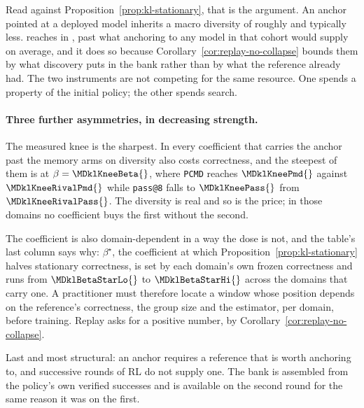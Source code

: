 \documentclass{article}
\newcommand{\1}{\mathbf 1}
\newcommand{\pmd}{\texttt{PCMD}}
\theoremstyle{remark}
\theoremstyle{definition}
\theoremstyle{plain}
\begin{document}
Read against Proposition~\ref{prop:kl-stationary}, that is the argument. An
anchor pointed at a deployed model inherits a macro diversity of roughly
\MDklHostedHi{} and typically less. \MDklTopMemoryArm{} reaches
\MDklTopMemoryPmd{} in \MDklTopMemoryDomain{}, past what anchoring to any
model in that cohort would supply on average, and it does so because
Corollary~\ref{cor:replay-no-collapse} bounds them by what discovery puts in
the bank rather than by what the reference already had. The two instruments are
not competing for the same resource. One spends a property of the initial
policy; the other spends search.

\paragraph{Three further asymmetries, in decreasing strength.}
The measured knee is the sharpest. In \MDklPricedNames{} every coefficient
that carries the anchor past the memory arms on diversity also costs correctness,
and the steepest of them is \MDklKneeDomain{} at $\beta=\MDklKneeBeta{}$, where
\pmd{} reaches $\MDklKneePmd{}$ against $\MDklKneeRivalPmd{}$ while
\texttt{pass@8} falls to $\MDklKneePass{}$ from $\MDklKneeRivalPass{}$. The
diversity is real and so is the price; in those domains no coefficient buys the
first without the second.

The coefficient is also domain-dependent in a way the dose is not, and the
table's last column says why: $\beta^\star$, the coefficient at which
Proposition~\ref{prop:kl-stationary} halves stationary correctness, is set by
each domain's own frozen correctness and runs from $\MDklBetaStarLo{}$ to
$\MDklBetaStarHi{}$ across the domains that carry one. A practitioner must therefore locate a window whose position
depends on the reference's correctness, the group size and the estimator, per
domain, before training. Replay asks for a positive
number, by Corollary~\ref{cor:replay-no-collapse}.

Last and most structural: an anchor requires a reference that is worth
anchoring to, and successive rounds of RL do not supply one. The bank is
assembled from the policy's own verified successes and is available on the
second round for the same reason it was on the first.
\end{document}
